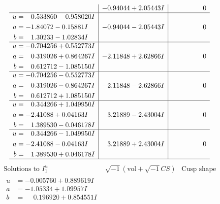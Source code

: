 \documentclass[1p]{elsarticle_modified}
\theoremstyle{definition}
\newcommand{\I}{\sqrt{-1}}
\begin{document}
$$\begin{array}{c|c|c}
 & -0.94044 + 2.05443 I & \phantom{-0.000000 } 0 \\ \hline\begin{aligned}
u &= -0.533860 - 0.958020 I \\
a &= -1.84072 - 0.15881 I \\
b &= \phantom{-}1.30233 - 1.02834 I\end{aligned}
 & -0.94044 - 2.05443 I & \phantom{-0.000000 } 0 \\ \hline\begin{aligned}
u &= -0.704256 + 0.552773 I \\
a &= \phantom{-}0.319026 + 0.864267 I \\
b &= \phantom{-}0.612712 - 1.085150 I\end{aligned}
 & -2.11848 + 2.62866 I & \phantom{-0.000000 } 0 \\ \hline\begin{aligned}
u &= -0.704256 - 0.552773 I \\
a &= \phantom{-}0.319026 - 0.864267 I \\
b &= \phantom{-}0.612712 + 1.085150 I\end{aligned}
 & -2.11848 - 2.62866 I & \phantom{-0.000000 } 0 \\ \hline\begin{aligned}
u &= \phantom{-}0.344266 + 1.049950 I \\
a &= -2.41088 + 0.04163 I \\
b &= \phantom{-}1.389530 - 0.046178 I\end{aligned}
 & \phantom{-}3.21889 - 2.43004 I & \phantom{-0.000000 } 0 \\ \hline\begin{aligned}
u &= \phantom{-}0.344266 - 1.049950 I \\
a &= -2.41088 - 0.04163 I \\
b &= \phantom{-}1.389530 + 0.046178 I\end{aligned}
 & \phantom{-}3.21889 + 2.43004 I & \phantom{-0.000000 } 0\\
 \hline 
 \end{array}$$\newpage$$\begin{array}{c|c|c}  
\text{Solutions to }I^u_{1}& \I (\text{vol} + \sqrt{-1}CS) & \text{Cusp shape}\\
 \hline 
\begin{aligned}
u &= -0.005760 + 0.889619 I \\
a &= -1.05334 + 1.09957 I \\
b &= \phantom{-}0.196920 + 0.854551 I\end{aligned}

\end{array}$$
\end{document}
